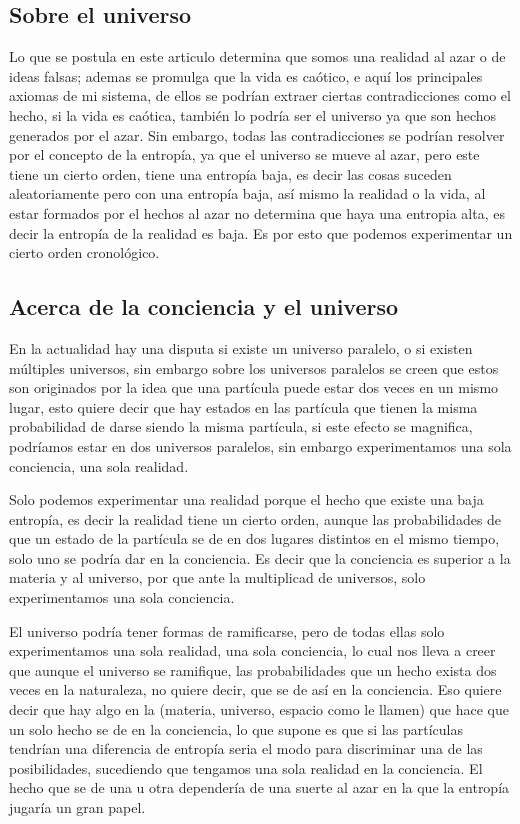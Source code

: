\documentclass[12pt,letterpaper, a4paper ]{article}
\begin{document}
\subsection{Sobre el universo}
Lo que se postula en este articulo determina que somos una realidad al azar o de ideas falsas; ademas se promulga que la vida es caótico, e aquí los principales axiomas de mi sistema, de ellos se podrían extraer ciertas contradicciones como el hecho, si la vida es caótica, también lo podría ser el universo ya que son hechos generados por el azar. Sin embargo, todas las contradicciones se podrían resolver por el concepto de la entropía, ya que el universo se mueve al azar, pero este tiene un cierto orden, tiene una entropía baja, es decir las cosas suceden aleatoriamente pero con una entropía baja, así mismo la realidad o la vida, al estar formados por el hechos al azar no determina que haya una entropia alta, es decir la entropía de la realidad es baja. Es por esto que podemos experimentar un cierto orden cronológico.


\subsection{Acerca de la conciencia y el universo}
En la actualidad hay una disputa si existe un universo paralelo, o si existen múltiples universos, sin embargo sobre los universos paralelos se creen que estos son originados por la idea que una partícula puede estar dos veces en un mismo lugar, esto quiere decir que hay estados en las partícula  que tienen la misma probabilidad de darse siendo la misma partícula, si este efecto se magnifica, podríamos estar en dos universos paralelos, sin embargo experimentamos una sola conciencia, una sola realidad.

Solo podemos experimentar una realidad porque el hecho que existe una baja entropía, es decir la realidad tiene un cierto orden, aunque las probabilidades de que un estado de la partícula se de en dos lugares distintos en el mismo tiempo, solo uno se podría dar en la conciencia. Es decir que la conciencia es superior a la materia y al universo, por que ante la multiplicad de universos, solo experimentamos una sola conciencia. 

El universo podría tener formas de ramificarse, pero de todas ellas solo experimentamos una sola realidad, una sola conciencia, lo cual nos lleva a creer que aunque el universo se ramifique, las probabilidades que un hecho exista dos veces en la naturaleza, no quiere decir, que se de así en la conciencia. Eso quiere decir que hay algo en la (materia, universo, espacio como le llamen) que hace que un solo hecho se de en la conciencia, lo que supone es que si las partículas tendrían una diferencia de entropía seria el modo para discriminar una de las posibilidades, sucediendo que tengamos una sola realidad en la conciencia. El hecho que se de una u otra dependería de una suerte al azar en la que la entropía jugaría un gran papel.
\end{document}
